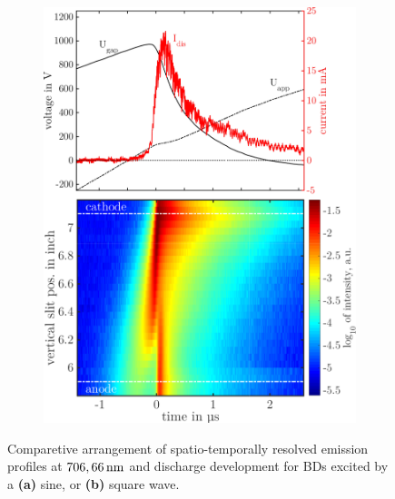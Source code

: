 \documentclass[a4paper,10pt,twoside]{article}
\newcommand{\fett}[1]{\textbf{#1}}
\begin{document}
\begin{figure}
\begin{subfigure}[t]{0.49\textwidth}
						\includegraphics[width=\textwidth]{figures/706nm@square/combination.pdf}
						\caption{}
						\label{img:combsquare}
					\end{subfigure}
					\caption{Comparetive arrangement of spatio-temporally resolved emission profiles at $\unit[706,66]{nm}$ and discharge development for BDs excited by a \fett{(a)} sine, or \fett{(b)} square wave.}
					\label{img:comparisonsinesquare}
				\end{figure}
				
	\begin{multicols*}{2}
			
	\end{multicols*}
				
	\twocolumn
\end{document}
